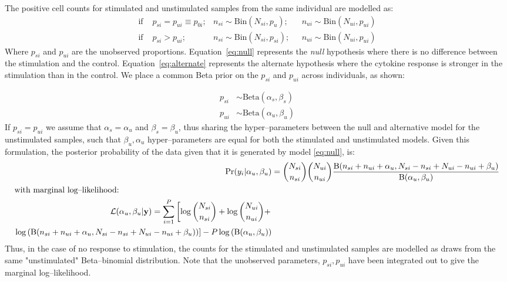 \documentclass[11pt]{article}
\begin{document}
The positive cell counts for stimulated and unstimulated samples from the same individual are modelled as:
\begin{align}
  \text{if }&p_{si}=p_{ui}\equiv p_{0i};& n_{si} \sim \mathrm{Bin}(N_{si},p_u);\text{ }& n_{ui} \sim \mathrm{Bin}(N_{ui},p_{ui})\label{eq:null}\\
 \text{if }&p_{si}>p_{ui};& n_{si} \sim \mathrm{Bin}(N_{si},p_{si});\text{ }& n_{ui} \sim \mathrm{Bin}(N_{ui},p_{ui})\label{eq:alternate}
 \end{align}
Where $p_{si}$ and $p_{ui}$ are the unobserved proportions. Equation~\eqref{eq:null} represents the \textit{null} hypothesis where there is no difference between the stimulation and the control. Equation~\eqref{eq:alternate} represents the  alternate hypothesis where the cytokine response is stronger in the stimulation than in the control. We place a common Beta prior on the $p_{si}$ and $p_{ui}$ across individuals, as shown:
 
 \begin{align}
 p_{si} &\sim \mathrm{Beta}(\alpha_s,\beta_s)\label{eq:stimprior}\\
 p_{ui} &\sim \mathrm{Beta}(\alpha_u, \beta_u)\label{eq:nullprior}
 \end{align}
If $p_{si}=p_{ui}$ we assume that $\alpha_s=\alpha_u$ and $\beta_s=\beta_u$, thus sharing the hyper--parameters between the null and alternative model for the unstimulated samples, such that $\beta_u,\alpha_u$ hyper--parameters are equal for both the stimulated and unstimulated models. Given this formulation, the posterior probability of the data given that it is generated by model \eqref{eq:null}, is:
 \begin{align}
  	\mathrm{Pr}(y_i|\alpha_u,\beta_u)
	&=\binom{N_{si}}{n_{si}}\binom{N_{ui}}{n_{ui}}\frac{\mathrm{B}(n_{si}+n_{ui}+\alpha_u,N_{si}-n_{si}+N_{ui}-n_{ui}+\beta_u)}{\mathrm{B}(\alpha_u,\beta_u)}\label{eq:model1post}\\
	\intertext{with marginal log--likelihood:}
	\begin{split}
	\mathcal{L}(\alpha_u,\beta_u|\mathbf{y})=\sum_{i=1}^P\left[\log{\binom{N_{si}}{n_{si}}}+\log{\binom{N_{ui}}{n_{ui}}}+\right.\\
	\left.\log{\left(\mathrm{B}(n_{si}+n_{ui}+\alpha_u,N_{si}-n_{si}+N_{ui}-n_{ui}+\beta_u)\right)}\right]-P\log\left(\mathrm{B}(\alpha_u,\beta_u)\right)\label{eq:model1MLL}
	\end{split}
 \end{align} 
Thus, in the case of no response to stimulation, the counts for the stimulated and unstimulated samples are modelled as draws from the same "unstimulated" Beta--binomial distribution. Note that the unobserved parameters, $p_{si}, p_{ui}$ have been integrated out to give the marginal log--likelihood.
\end{document}
